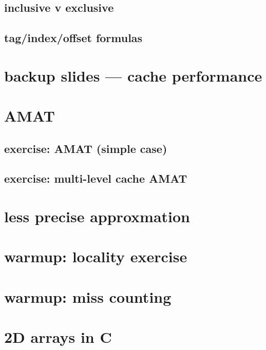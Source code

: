 \subsection{inclusive v exclusive}


\subsection{tag/index/offset formulas}


\section{backup slides --- cache performance}

\section{AMAT}


\subsection{exercise: AMAT (simple case)}


\subsection{exercise: multi-level cache AMAT}


\section{less precise approxmation}


\section{warmup: locality exercise}  %


\section{warmup: miss counting}


\section{2D arrays in C}



